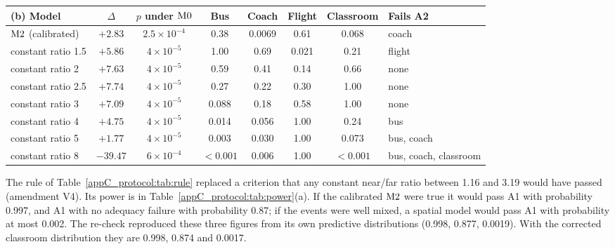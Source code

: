 \begin{table}[tbp]
  \medskip
  \begin{tabular}{@{}lccccccl@{}}
    \toprule
    (b) Model & $\Delta$ & $p$ under $\mathrm{M0}$ & Bus & Coach & Flight & Classroom & Fails A2 \\
    \midrule
    $\mathrm{M2}$ (calibrated) & $+2.83$ & $2.5\times10^{-4}$ & 0.38 & 0.0069 & 0.61 & 0.068 & coach \\
    \addlinespace
    constant ratio 1.5 & $+5.86$ & $4\times10^{-5}$ & 1.00 & 0.69 & 0.021 & 0.21 & flight \\
    constant ratio 2 & $+7.63$ & $4\times10^{-5}$ & 0.59 & 0.41 & 0.14 & 0.66 & none \\
    constant ratio 2.5 & $+7.74$ & $4\times10^{-5}$ & 0.27 & 0.22 & 0.30 & 1.00 & none \\
    constant ratio 3 & $+7.09$ & $4\times10^{-5}$ & 0.088 & 0.18 & 0.58 & 1.00 & none \\
    constant ratio 4 & $+4.75$ & $4\times10^{-5}$ & 0.014 & 0.056 & 1.00 & 0.24 & bus \\
    constant ratio 5 & $+1.77$ & $4\times10^{-5}$ & 0.003 & 0.030 & 1.00 & 0.073 & bus, coach \\
    constant ratio 8 & $-39.47$ & $6\times10^{-4}$ & $<0.001$ & 0.006 & 1.00 & $<0.001$ & bus, coach, classroom \\
    \bottomrule
  \end{tabular}
\end{table}

The rule of Table~\ref{appC_protocol:tab:rule} replaced a criterion that any constant near/far ratio between
1.16 and 3.19 would have passed (amendment V4). Its power is in Table~\ref{appC_protocol:tab:power}(a). If the
calibrated $\mathrm{M2}$ were true it would pass A1 with probability 0.997, and A1 with no adequacy failure with
probability 0.87; if the events were well mixed, a spatial model would pass A1 with probability at most 0.002.
The re-check reproduced these three figures from its own predictive distributions (0.998, 0.877, 0.0019).
With the corrected classroom distribution they are 0.998, 0.874 and 0.0017.

